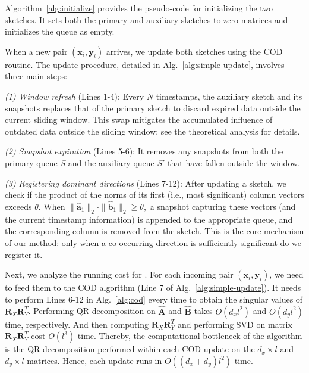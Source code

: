 Algorithm~\ref{alg:initialize} provides the pseudo-code for initializing the two sketches. It sets both the primary and auxiliary sketches to zero matrices and initializes the queue as empty. 




 When a new pair \((\boldsymbol{x}_i,\boldsymbol{y}_i)\) arrives, we update both sketches using the COD routine. The update procedure, detailed in Alg.\ \ref{alg:simple-update}, involves three main steps:

  
  {\em (1) Window refresh} (Lines 1-4): Every \(N\) timestamps, the auxiliary sketch and its snapshots replaces that of the primary sketch to discard expired data outside the current sliding window. This swap mitigates the accumulated influence of outdated data outside the sliding window; see the theoretical analysis for details.
  
  {\em (2) Snapshot expiration} (Lines 5-6): It removes any snapshots from both the primary queue \(S\) and the auxiliary queue \(S'\) that have fallen outside the window.
  
  {\em (3) Registering dominant directions} (Lines 7-12): After updating a sketch, we check if the product of the norms of its first (i.e., most significant) column vectors exceeds \(\theta\). When 
  \(
  \|\hat{\boldsymbol{a}}_1\|_2 \cdot \|\hat{\boldsymbol{b}}_1\|_2 \ge \theta,
  \)
  a snapshot capturing these vectors (and the current timestamp information) is appended to the appropriate queue, and the corresponding column is removed from the sketch. This is the core mechanism of our method: only when a co-occurring direction is sufficiently significant do we register it.



 Next, we analyze the running cost for \oursolution. For each incoming pair $(\boldsymbol{x}_i,\boldsymbol{y}_i)$, we need to feed them to the COD algorithm (Line 7 of Alg.\ \ref{alg:simple-update}). It needs to perform Lines 6-12 in Alg.\ \ref{alg:cod} every time to obtain the singular values of $\boldsymbol{R}_X\boldsymbol{R}_Y^T$. Performing QR decomposition on $\hat{\boldsymbol{A}}$ and $\hat{\boldsymbol{B}}$ takes $O(d_xl^2)$ and $O(d_yl^2)$ time, respectively. And then computing $\boldsymbol{R}_X\boldsymbol{R}_Y^T$ and performing SVD on matrix $\boldsymbol{R}_X\boldsymbol{R}_Y^T$ cost $O(l^3)$ time. Thereby, the computational bottleneck of the algorithm is the QR decomposition performed within each COD update on the \(d_x \times l\) and \(d_y \times l\) matrices. Hence, each update runs in \(O((d_x+d_y)l^2)\) time.


